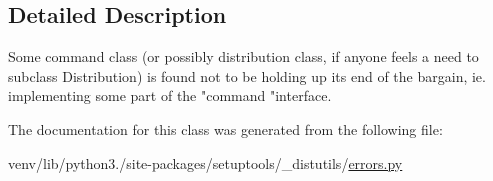 \subsection{Detailed Description}
\begin{DoxyVerb}Some command class (or possibly distribution class, if anyone
feels a need to subclass Distribution) is found not to be holding
up its end of the bargain, ie. implementing some part of the
"command "interface.\end{DoxyVerb}
 

The documentation for this class was generated from the following file\+:\begin{DoxyCompactItemize}
\item 
venv/lib/python3./site-\/packages/setuptools/\+\_\+distutils/\hyperlink{__distutils_2errors_8py}{errors.\+py}\end{DoxyCompactItemize}
